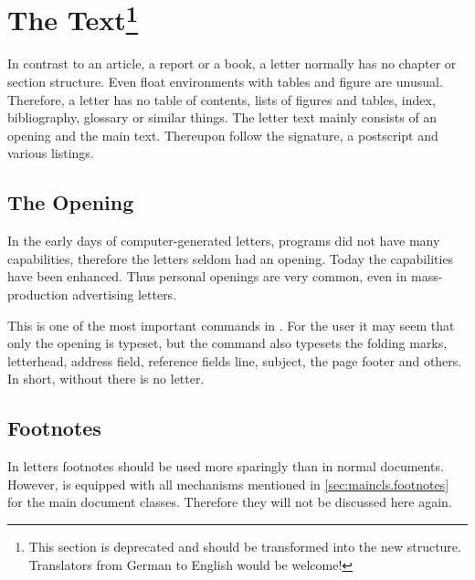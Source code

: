 \section{The Text\protect\footnote{This section is
  deprecated and should be transformed into the new structure. Translators
  from German to English would be welcome!}}
\label{sec:scrlttr2.text}

In contrast to an article, a report or a book, a letter normally has
no chapter or section structure.  Even float environments with tables
and figure are unusual.  Therefore, a letter has no table of contents,
lists of figures and tables, index, bibliography, glossary or similar
things.  The letter text mainly consists of an opening and the main
text. Thereupon follow the signature, a postscript and various
listings.


\subsection{The Opening}
\label{sec:scrlttr2.opening}

\begin{Explain}
  In the early days of computer-generated letters, programs did not
  have many capabilities, therefore the letters seldom had an opening.
  Today the capabilities have been enhanced. Thus personal openings
  are very common, even in mass-production advertising letters.
\end{Explain}

\begin{Declaration}
\end{Declaration}
%
This is one of the most important commands in .  For
the user it may seem that only the opening is typeset, but the command
also typesets the folding marks, letterhead, address field, reference
fields line, subject, the page footer and others. In short, without
 there is no letter.
%
%

\subsection{Footnotes}
\label{sec:scrlttr2.footnotes}

In letters footnotes should be used more sparingly than in normal
documents. However,  is equipped with all mechanisms
mentioned in \autoref{sec:maincls.footnotes} for the main document
classes. Therefore they will not be discussed here again.

